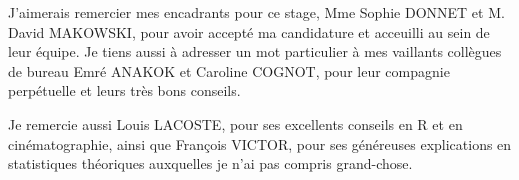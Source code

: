 \documentclass{book}
\begin{document}
\noindent
\large{J'aimerais remercier mes encadrants pour ce stage, Mme Sophie DONNET et
    M. David MAKOWSKI, pour avoir accepté ma candidature et acceuilli au sein de
    leur équipe. Je tiens aussi à adresser un mot particulier à mes vaillants collègues de bureau Emré ANAKOK et Caroline COGNOT, pour leur compagnie perpétuelle et leurs très bons
    conseils.}
\par %
{Je remercie aussi Louis LACOSTE, pour ses excellents conseils en R et en cinématographie, ainsi que François VICTOR, pour ses généreuses explications en statistiques théoriques auxquelles je n'ai pas compris grand-chose. }
\thispagestyle{fancy}
\clearpage %


\newpage
\mbox{} %
\thispagestyle{fancy}


\newpage
\fancyhead[LE,RO]{\leftmark}
\tableofcontents %
\thispagestyle{fancy}


\newpage
\mbox{} %


\newpage
\listoffigures %
\thispagestyle{fancy}

\end{document}
